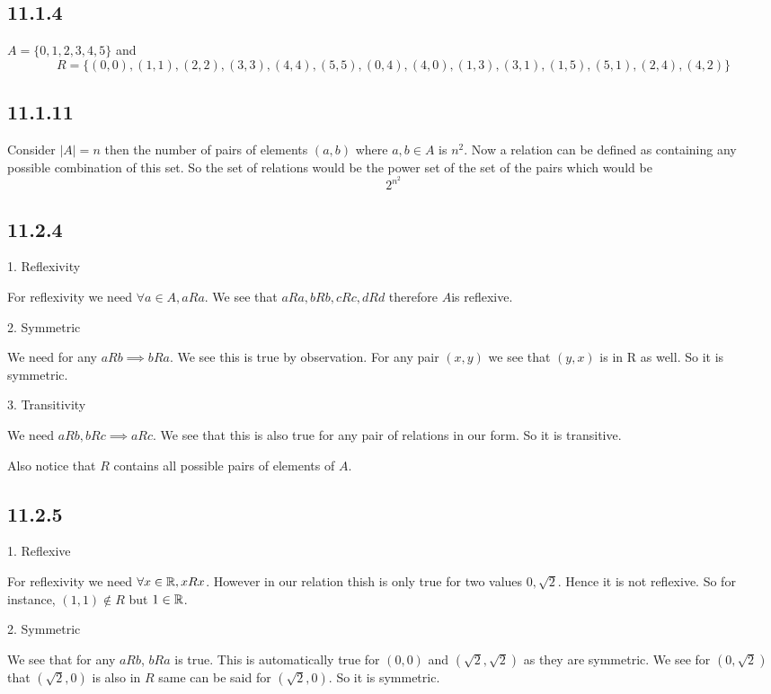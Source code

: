 \documentclass[a4paper]{report}
\begin{document}
\subsection*{11.1.4}
$A = \{0,1,2,3,4,5\}$ and  $$R = \{(0,0),(1,1),(2,2),(3,3),(4,4),(5,5),(0,4),(4,0),(1,3),(3,1),(1,5),(5,1),(2,4),(4,2)\}$$

\subsection*{11.1.11}
Consider $|A| = n$ then the number of pairs of elements  $(a,b)$  where $a,b \in A$ is $n^2$. Now a relation can be defined as containing any possible combination of this set. So the set of relations would be the power set of the set of the pairs which would be $$2^{n^2}$$

\subsection*{11.2.4}
1. Reflexivity

For reflexivity we need $\forall a \in A, aRa$. We see that $aRa, bRb, cRc, dRd$ therefore $A$is reflexive.

2. Symmetric

We need for any  $aRb \implies bRa$. We see this is true by observation. For any pair  $(x,y)$ we see that $(y,x)$ is in R as well. So it is symmetric.


3. Transitivity

We need $aRb, bRc \implies aRc$. We see that this is also true for any pair of relations in our form. So it is transitive.

Also notice that $R$ contains all possible pairs of elements of $A$.

\subsection*{11.2.5}
1. Reflexive


For reflexivity we need $\forall x \in \mathbb{R}, xRx$. However in our relation thish is only true for two values $0,\sqrt{2}$. Hence it is not reflexive. So for instance, $(1,1) \not \in R$ but  $1 \in \mathbb{R}$.

2. Symmetric

We see that for any $aRb$, $bRa$ is true. This is automatically true for $(0,0)$ and $(\sqrt 2, \sqrt 2)$ as they are symmetric. We see for $(0,\sqrt 2)$ that $(\sqrt 2,0)$ is also in $R$ same can be said for $(\sqrt 2, 0)$. So it is symmetric.
\end{document}
